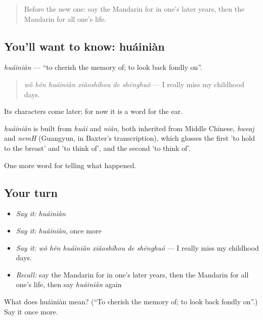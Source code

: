 \label{lesson:ZH-C322-huainian}



\begin{quote}
Before the new one: say the Mandarin for in one's later years, then the Mandarin for all one's life.
\end{quote}

\subsection*{You'll want to know: huáiniàn}
\emph{huáiniàn} — \textquotedblleft{}to cherish the memory of; to look back fondly on\textquotedblright{}.

\begin{quote}
\emph{wǒ hěn huáiniàn xiǎoshíhou de shēnghuó} — I really miss my childhood days.
\end{quote}

Its characters come later; for now it is a word for the ear.

\begin{cousinweb}
\emph{huáiniàn} is built from \emph{huái} and \emph{niàn}, both inherited from Middle Chinese, \emph{hweaj} and \emph{nemH} (Guangyun, in Baxter's transcription), which glosses the first 'to hold to the breast' and 'to think of', and the second 'to think of'.
\end{cousinweb}

\begin{grammarlens}[title={What you've built}]
One more word for telling what happened.
\end{grammarlens}

\subsection*{Your turn}
\begin{itemize}
\raggedright
  \item \emph{Say it:} \emph{huáiniàn}
  \item \emph{Say it:} \emph{huáiniàn}, once more
  \item \emph{Say it:} \emph{wǒ hěn huáiniàn xiǎoshíhou de shēnghuó} — I really miss my childhood days.
  \item \emph{Recall:} say the Mandarin for in one's later years, then the Mandarin for all one's life, then say \emph{huáiniàn} again
\end{itemize}

\begin{tcolorbox}[breakable,colback=teal!4,colframe=teal!35!black,title={Before you move on}]
What does huáiniàn mean? (\textquotedblleft{}To cherish the memory of; to look back fondly on\textquotedblright{}.) Say it once more.
\end{tcolorbox}
